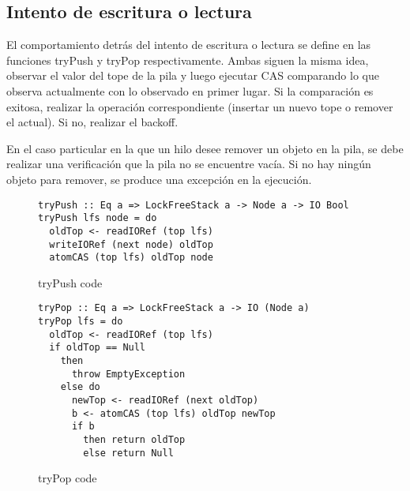 \clearpage
\subsection{Intento de escritura o lectura}
El comportamiento detrás del intento de escritura o lectura se define en las funciones tryPush y tryPop respectivamente. Ambas siguen la misma idea, observar el valor del tope de la pila y luego ejecutar CAS comparando lo que observa actualmente con lo observado en primer lugar. Si la comparación es exitosa, realizar la operación correspondiente (insertar un nuevo tope o remover el actual). Si no, realizar el backoff.

En el caso particular en la que un hilo desee remover un objeto en la pila, se debe realizar una verificación que la pila no se encuentre vacía. Si no hay ningún objeto para remover, se produce una excepción en la ejecución.

\begin{figure}[h]
\begin{verbatim}
tryPush :: Eq a => LockFreeStack a -> Node a -> IO Bool
tryPush lfs node = do
  oldTop <- readIORef (top lfs)
  writeIORef (next node) oldTop
  atomCAS (top lfs) oldTop node
\end{verbatim}
\caption{tryPush code}
\end{figure}

\begin{figure}[h]
\begin{verbatim}
tryPop :: Eq a => LockFreeStack a -> IO (Node a)
tryPop lfs = do
  oldTop <- readIORef (top lfs)
  if oldTop == Null
    then
      throw EmptyException
    else do
      newTop <- readIORef (next oldTop)
      b <- atomCAS (top lfs) oldTop newTop
      if b
        then return oldTop
        else return Null
\end{verbatim}
\caption{tryPop code}
\end{figure}

\clearpage
